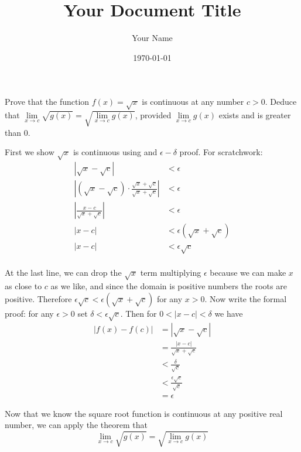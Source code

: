 \documentclass{article}
\title{Your Document Title}
\author{Your Name}
\date{\today} %
\begin{document}
\maketitle
\begin{problem}
Prove that the function $f(x) = \sqrt{x}$ is continuous at any number $c > 0$. Deduce that $\lim\limits_{x\to c}\sqrt{g(x)} = \sqrt{\lim\limits_{x \to c} g(x)}$, provided $\lim\limits_{x \to c} g(x)$ exists and is greater than 0.
\end{problem}

First we show $\sqrt{x}$ is continuous using and $\epsilon-\delta$ proof. For scratchwork:
\begin{align*}
  |\sqrt{x} - \sqrt{c} |                                                       & < \epsilon                      \\
  |(\sqrt{x} - \sqrt{c})\cdot \frac{\sqrt{x} + \sqrt{c}}{\sqrt{x} + \sqrt{c}}| & < \epsilon                      \\
  |\frac{x - c}{\sqrt{x} + \sqrt{c}}|                                          & < \epsilon                      \\
  |x - c|                                                                      & < \epsilon(\sqrt{x} + \sqrt{c}) \\
  |x - c|                                                                      & < \epsilon\sqrt{c}              \\
\end{align*}

At the last line, we can drop the $\sqrt{x}$ term multiplying $\epsilon$ because we can make $x$ as close to $c$ as we like, and since the domain is positive numbers the roots are positive. Therefore $\epsilon\sqrt{c} < \epsilon(\sqrt{x} + \sqrt{c})$ for any $x > 0$. Now write the formal proof: for any $\epsilon > 0$ set $\delta < \epsilon\sqrt{c}$. Then for $0 < |x - c| < \delta$ we have
\begin{align*}
  |f(x) - f(c)| & = |\sqrt{x} - \sqrt{c}|               \\
                & = \frac{|x - c|}{\sqrt{x} + \sqrt{c}} \\
                & < \frac{\delta}{\sqrt{c}}             \\
                & < \frac{\epsilon\sqrt{c}}{\sqrt{c}}   \\
                & = \epsilon
\end{align*}

Now that we know the square root function is continuous at any positive real number, we can apply the theorem that
$$\lim_{x \to c} \sqrt{g(x)} = \sqrt{\lim_{x \to c} g(x)}$$
\end{document}

